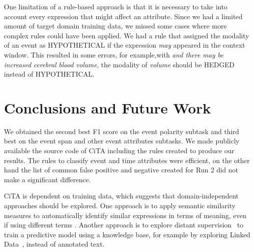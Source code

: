 \documentclass[11pt,a4paper]{article}
\begin{document}
One limitation of a rule-based approach is that it is necessary to take into account every expression that might affect an attribute.
Since we had a limited amount of target domain training data, we missed some cases where more complex rules could have been applied. 
We had a rule that assigned the modality of an event as HYPOTHETICAL if the expression \textit{may} appeared in the context window.
This resulted in some errors, for example,with  \textit{and there may be increased cerebral blood volume}, the modality of \textit{volume} should be HEDGED instead of HYPOTHETICAL.






\section{Conclusions and Future Work}

We obtained the second best F1 score on the event polarity subtask and third best on the event span and other event attributes subtasks.
We made publicly available the source code of CiTA including the rules created to produce our results.
The rules to classify event and time attributes were efficient, on the other hand  
the list of common false positive and negative created for Run 2 did not make a significant difference.

CiTA is dependent on training data, which suggests that domain-independent approaches should be explored.
One approach is to apply semantic similarity measures to automatically identify similar expressions in terms of meaning, even if using different terms \cite{couto2013next}. 
Another approach is to explore distant supervision~\cite{Lamurias2017} to train a predictive model using a knowledge base, for example by exploring Linked Data~\cite{barros2016knowledge}, instead of annotated text.

\end{document}
